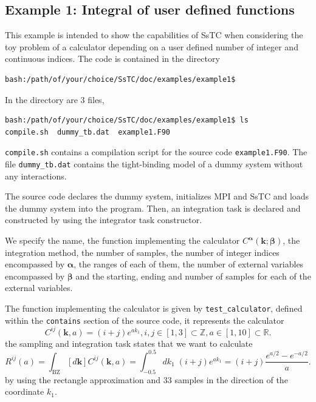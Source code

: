 \documentclass[10pt,a4paper]{article}
\begin{document}
\subsection{Example 1: Integral of user defined functions}
This example is intended to show the capabilities of SsTC when considering the toy problem of a calculator depending on a user defined number of integer and continuous indices. The code is contained in the directory
\begin{codebox}{}
\begin{verbatim}
bash:/path/of/your/choice/SsTC/doc/examples/example1$
\end{verbatim}
\end{codebox}
In the directory are 3 files,
\begin{codebox}{}
\begin{verbatim}
bash:/path/of/your/choice/SsTC/doc/examples/example1$ ls
compile.sh  dummy_tb.dat  example1.F90
\end{verbatim}
\end{codebox}
\verb|compile.sh| contains a compilation script for the source code \verb|example1.F90|. The file \verb|dummy_tb.dat| contains the tight-binding model of a dummy system  without any interactions.

The source code declares the dummy system, initializes MPI and SsTC and loads the dummy system into the program. Then, an integration task is declared and constructed by using the integrator task constructor.

We specify the name, the function implementing the calculator $C^{\bm{\alpha}}(\bm{k}; \bm{\beta})$, the integration method, the number of samples, the number of integer indices encompassed by $\bm{\alpha}$, the ranges of each of them, the number of external variables encompassed by $\bm{\beta}$ and the starting, ending and number of samples for each of the external variables.

The function implementing the calculator is given by \verb|test_calculator|, defined within the \verb|contains| section of the source code, it represents the calculator
\begin{equation}
C^{ij}(\bm{k}, a) = (i + j)e^{a k_1}, i, j\in [1, 3]\subset \mathbb{Z}, a\in [1, 10]\subset \mathbb{R}.
\end{equation}
the sampling and integration task states that we want to calculate
\begin{equation}
R^{ij}(a) = \int_{\text{BZ}} \left[d\bm{k}\right]C^{ij}(\bm{k}, a) = \int_{-0.5}^{0.5} dk_1\;(i + j)e^{a k_1} = (i + j)\frac{e^{a/2}-e^{-a/2}}{a}.
\end{equation}
by using the rectangle approximation and 33 samples in the direction of the coordinate $k_1$.
\end{document}
